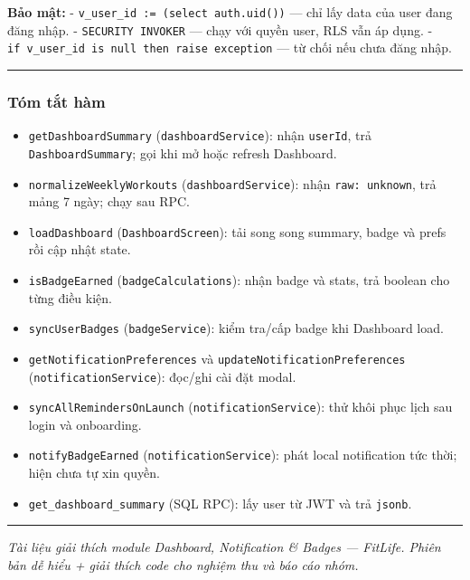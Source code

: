 \documentclass[12pt,a4paper]{article}
\providecommand{\tightlist}{%
  \setlength{\itemsep}{0pt}\setlength{\parskip}{0pt}}
\begin{document}
\textbf{Bảo mật:} - \texttt{v\_user\_id\ :=\ (select\ auth.uid())} ---
chỉ lấy data của user đang đăng nhập. - \texttt{SECURITY\ INVOKER} ---
chạy với quyền user, RLS vẫn áp dụng. -
\texttt{if\ v\_user\_id\ is\ null\ then\ raise\ exception} --- từ chối
nếu chưa đăng nhập.

\begin{center}\rule{0.5\linewidth}{0.5pt}\end{center}

\subsubsection{Tóm tắt hàm}\label{tuxf3m-tux1eaft-huxe0m}

\begin{itemize}
\tightlist
\item
  \texttt{getDashboardSummary} (\texttt{dashboardService}): nhận
  \texttt{userId}, trả \texttt{DashboardSummary}; gọi khi mở hoặc
  refresh Dashboard.
\item
  \texttt{normalizeWeeklyWorkouts} (\texttt{dashboardService}): nhận
  \texttt{raw:\ unknown}, trả mảng 7 ngày; chạy sau RPC.
\item
  \texttt{loadDashboard} (\texttt{DashboardScreen}): tải song song
  summary, badge và prefs rồi cập nhật state.
\item
  \texttt{isBadgeEarned} (\texttt{badgeCalculations}): nhận badge và
  stats, trả boolean cho từng điều kiện.
\item
  \texttt{syncUserBadges} (\texttt{badgeService}): kiểm tra/cấp badge
  khi Dashboard load.
\item
  \texttt{getNotificationPreferences} và
  \texttt{updateNotificationPreferences} (\texttt{notificationService}):
  đọc/ghi cài đặt modal.
\item
  \texttt{syncAllRemindersOnLaunch} (\texttt{notificationService}): thử
  khôi phục lịch sau login và onboarding.
\item
  \texttt{notifyBadgeEarned} (\texttt{notificationService}): phát local
  notification tức thời; hiện chưa tự xin quyền.
\item
  \texttt{get\_dashboard\_summary} (SQL RPC): lấy user từ JWT và trả
  \texttt{jsonb}.
\end{itemize}

\begin{center}\rule{0.5\linewidth}{0.5pt}\end{center}

\emph{Tài liệu giải thích module Dashboard, Notification \& Badges ---
FitLife. Phiên bản dễ hiểu + giải thích code cho nghiệm thu và báo cáo
nhóm.}
\end{document}
